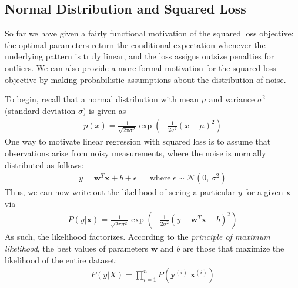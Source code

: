 \documentclass[a4paper,12pt]{article}
\theoremstyle{definition}
\begin{document}
    \subsection*{Normal Distribution and Squared Loss}
    So far we have given a fairly functional motivation of the squared loss objective: the optimal parameters return the conditional expectation 
    whenever the underlying pattern is truly linear, and the loss assigns outsize penalties for outliers. We can also provide a more formal motivation for the squared loss objective by making probabilistic assumptions about the distribution of noise.

    To begin, recall that a normal distribution with mean $\mu$ and variance $\sigma^2$ (standard deviation $\sigma$) is given as
    \begin{equation*}
        \begin{aligned}
            p(x) = \frac{1}{\sqrt{2\pi\sigma^2}}\exp({-\frac{1}{2\sigma^2}(x-\mu)^2})
        \end{aligned}
    \end{equation*}
    One way to motivate linear regression with squared loss is to assume that observations arise from noisy measurements, where the noise is normally distributed as follows:
    \begin{equation*}
        \begin{aligned}
            y = \mathbf{w}^T\mathbf{x} + b + \epsilon & & \textrm{where}\ \epsilon \sim \mathcal{N}(0,\,\sigma^{2})
        \end{aligned}
    \end{equation*}
    Thus, we can now write out the likelihood of seeing a particular $y$ for a given $\mathbf{x}$ via
    \begin{equation*}
        \begin{aligned}
            P(y|\mathbf{x}) = \frac{1}{\sqrt{2\pi\sigma^2}}\exp({-\frac{1}{2\sigma^2}(y - \mathbf{w}^T\mathbf{x} - b)^2})
        \end{aligned}
    \end{equation*}
    As such, the likelihood factorizes. According to the \textit{principle of maximum likelihood}, the best values of parameters $\mathbf{w}$ and $b$ 
    are those that maximize the likelihood of the entire dataset:
    \begin{equation*}
        \begin{aligned}
            P(y|X) = \prod_{i=1}^{n}P(\mathbf{y}^{(i)}|\mathbf{x}^{(i)})
        \end{aligned}
    \end{equation*}
\end{document}

